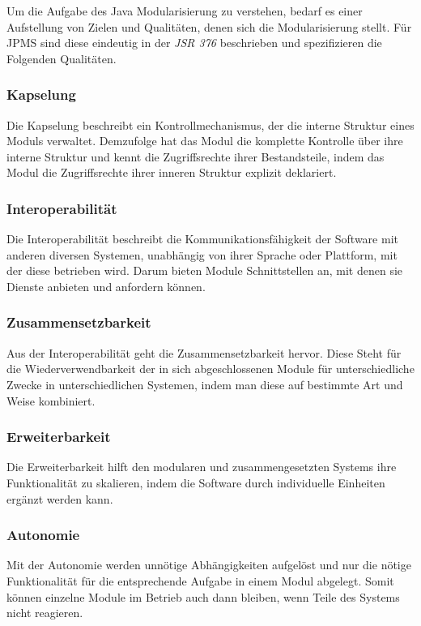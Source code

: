     Um die Aufgabe des Java Modularisierung zu verstehen, bedarf es einer Aufstellung von Zielen und Qualitäten, denen sich die Modularisierung stellt. Für JPMS sind diese eindeutig in der \textit{JSR 376} \cite{jmsOracle,java9modRevealed} beschrieben und spezifizieren die Folgenden Qualitäten.

    \subsubsection{Kapselung}
      Die Kapselung beschreibt ein Kontrollmechanismus, der die interne Struktur eines Moduls verwaltet. Demzufolge hat das Modul die komplette Kontrolle über ihre interne Struktur und kennt die Zugriffsrechte ihrer Bestandsteile, indem das Modul die Zugriffsrechte ihrer inneren Struktur explizit deklariert.

    \subsubsection{Interoperabilität}
      Die Interoperabilität beschreibt die Kommunikationsfähigkeit der Software mit anderen diversen Systemen, unabhängig von ihrer Sprache oder Plattform, mit der diese betrieben wird. Darum bieten Module Schnittstellen an, mit denen sie Dienste anbieten und anfordern können.

    \subsubsection{Zusammensetzbarkeit}
      Aus der Interoperabilität geht die Zusammensetzbarkeit hervor.  Diese Steht für die Wiederverwendbarkeit der in sich abgeschlossenen Module für unterschiedliche Zwecke in unterschiedlichen Systemen, indem man diese auf bestimmte Art und Weise kombiniert. 

    \subsubsection{Erweiterbarkeit}
     Die Erweiterbarkeit hilft den modularen und zusammengesetzten Systems ihre Funktionalität zu skalieren, indem die Software durch individuelle Einheiten ergänzt werden kann. 

    \subsubsection{Autonomie}
      Mit der Autonomie werden unnötige Abhängigkeiten aufgelöst und nur die nötige Funktionalität für die entsprechende Aufgabe in einem Modul abgelegt. Somit können einzelne Module im Betrieb auch dann bleiben, wenn Teile des Systems nicht reagieren.

